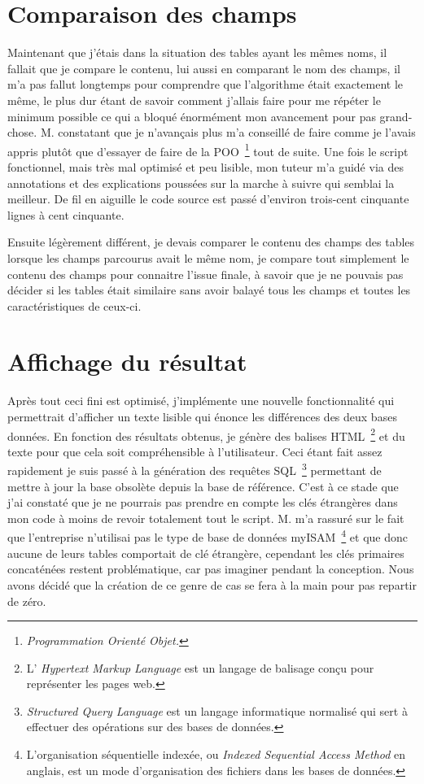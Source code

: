 \section{Comparaison des champs}

Maintenant que j'étais dans la situation des tables ayant les mêmes noms, il
fallait que je compare le contenu, lui aussi en comparant le nom des champs, il
m'a pas fallut longtemps pour comprendre que l'algorithme était exactement le
même, le plus dur étant de savoir comment j'allais faire pour me répéter le
minimum possible ce qui a bloqué énormément mon avancement pour pas
grand-chose. M. constatant que je n'avançais plus m'a conseillé de
faire comme je l'avais appris plutôt que d'essayer de faire de la POO\,
\footnote{\emph{Programmation Orienté Objet.}} tout de suite. Une fois le
script fonctionnel, mais très mal optimisé et peu lisible, mon tuteur m'a guidé
via des annotations et des explications poussées sur la marche à suivre qui
semblai la meilleur. De fil en aiguille le code source est passé d'environ
trois-cent cinquante lignes à cent cinquante.

Ensuite légèrement différent, je devais comparer le contenu des champs des
tables lorsque les champs parcourus avait le même nom, je compare tout
simplement le contenu des champs pour connaitre l'issue finale, à savoir que je
ne pouvais pas décider si les tables était similaire sans avoir balayé tous les
champs et toutes les caractéristiques de ceux-ci.

\section{Affichage du résultat}

Après tout ceci fini est optimisé, j'implémente une nouvelle fonctionnalité qui
permettrait d'afficher un texte lisible qui énonce les différences des deux
bases données. En fonction des résultats obtenus, je génère des balises HTML\,
\footnote{L’ \emph{Hypertext Markup Language} est un langage de balisage conçu
pour représenter les pages web.} et du texte pour que cela soit compréhensible
à l'utilisateur. Ceci étant fait assez rapidement je suis passé à la génération
des requêtes SQL\, \footnote{\emph{Structured Query Language} est un langage
informatique normalisé qui sert à effectuer des opérations sur des bases de
données.} permettant de mettre à jour la base obsolète depuis la base de
référence. C'est à ce stade que j'ai constaté que je ne pourrais pas prendre en
compte les clés étrangères dans mon code à moins de revoir totalement tout le
script. M. m'a rassuré sur le fait que l'entreprise n'utilisai pas
le type de base de données myISAM\, \footnote{L'organisation séquentielle
indexée, ou \emph{Indexed Sequential Access Method} en anglais, est un mode
d'organisation des fichiers dans les bases de données.} et que donc aucune de
leurs tables comportait de clé étrangère, cependant les clés primaires
concaténées restent problématique, car pas imaginer pendant la conception. Nous
avons décidé que la création de ce genre de cas se fera à la main pour pas
repartir de zéro.

